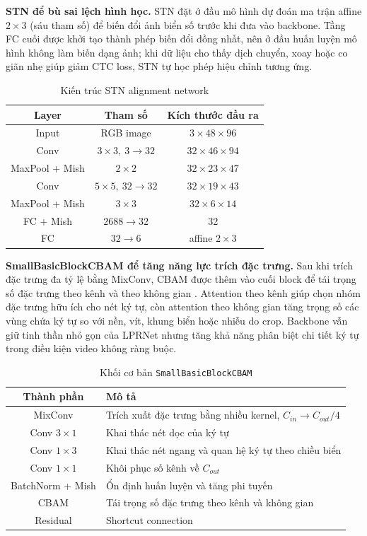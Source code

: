 \documentclass[../DoAn.tex]{subfiles}
\begin{document}
\textbf{STN để bù sai lệch hình học.}
STN đặt ở đầu mô hình dự đoán ma trận affine $2 \times 3$ (sáu tham số) để biến đổi ảnh biển số trước khi đưa vào backbone. Tầng FC cuối được khởi tạo thành phép biến đổi đồng nhất, nên ở đầu huấn luyện mô hình không làm biến dạng ảnh; khi dữ liệu cho thấy dịch chuyển, xoay hoặc co giãn nhẹ giúp giảm CTC loss, STN tự học phép hiệu chỉnh tương ứng.

\begin{table}[htbp]
\centering
\caption{Kiến trúc STN alignment network}
\label{tab:stn-alignment-network}
\begin{tabular}{|c|c|c|}
\hline
Layer & Tham số & Kích thước đầu ra \\
\hline
Input & RGB image & $3 \times 48 \times 96$ \\
Conv & $3 \times 3,\ 3 \rightarrow 32$ & $32 \times 46 \times 94$ \\
MaxPool + Mish & $2 \times 2$ & $32 \times 23 \times 47$ \\
Conv & $5 \times 5,\ 32 \rightarrow 32$ & $32 \times 19 \times 43$ \\
MaxPool + Mish & $3 \times 3$ & $32 \times 6 \times 14$ \\
FC + Mish & $2688 \rightarrow 32$ & 32 \\
FC & $32 \rightarrow 6$ & affine $2 \times 3$ \\
\hline
\end{tabular}
\end{table}

\textbf{SmallBasicBlockCBAM để tăng năng lực trích đặc trưng.}
Sau khi trích đặc trưng đa tỷ lệ bằng MixConv, CBAM được thêm vào cuối block để tái trọng số đặc trưng theo kênh và theo không gian \cite{woo2018cbam}. Attention theo kênh giúp chọn nhóm đặc trưng hữu ích cho nét ký tự, còn attention theo không gian tăng trọng số các vùng chứa ký tự so với nền, vít, khung biển hoặc nhiễu do crop. Backbone vẫn giữ tinh thần nhỏ gọn của LPRNet nhưng tăng khả năng phân biệt chi tiết ký tự trong điều kiện video không ràng buộc.

\begin{table}[htbp]
\centering
\small
\renewcommand{\arraystretch}{1.2}
\caption{Khối cơ bản \texttt{SmallBasicBlockCBAM}}
\label{tab:small-basic-block-cbam}
\begin{tabular}{|c|p{8cm}|}
\hline
\textbf{Thành phần} & \textbf{Mô tả} \\
\hline
MixConv & Trích xuất đặc trưng bằng nhiều kernel, $C_{in} \rightarrow C_{out}/4$ \\
Conv $3 \times 1$ & Khai thác nét dọc của ký tự \\
Conv $1 \times 3$ & Khai thác nét ngang và quan hệ ký tự theo chiều biển \\
Conv $1 \times 1$ & Khôi phục số kênh về $C_{out}$ \\
BatchNorm + Mish & Ổn định huấn luyện và tăng phi tuyến \\
CBAM & Tái trọng số đặc trưng theo kênh và không gian \\
Residual & Shortcut connection \\
\hline
\end{tabular}
\end{table}
\end{document}
